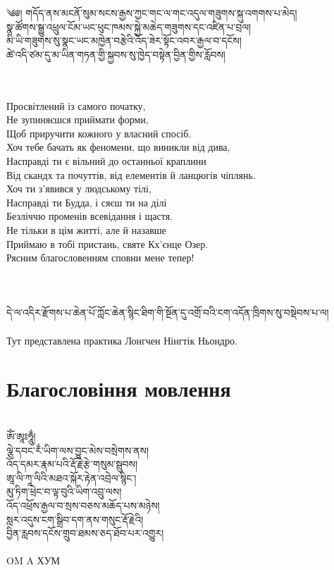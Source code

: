 \small
\ti
༄༅། གདོད་ནས་མངནོ་སུམ་སངས་རྒྱས་ཀྱང་གང་ལ་གང་འདུལ་གཟུགས་སྐུ་འགགས་པ་མེད།\\
སྣ་ཚོགས་སྒྱུ་འཕྲུལ་ངོམ་ཡང་ཕུང་ཁམས་སྐྱེ་མཆེད་གཟུགས་དང་འཛིན་པ་བྲལ།\\
མི་ཡི་གཟུགས་སུ་སྣང་ཡང་མཁྱེན་བརྩེའི་འོད་ཟེར་སྟོང་འབར་རྒྱལ་བ་དངོས།\\
ཚེ་འདི་ཙམ་དུ་མ་ཡིན་གཏན་གྱི་སྐྱབས་སུ་ཁྱེད་བསྟེན་བྱིན་གྱིས་རློབས།\\
\\
\\
\ru

Просвітлений із самого початку,\\
Не зупиняєшся приймати форми,\\
Щоб приручити кожного у власний спосіб.\\
Хоч тебе бачать як феномени, що виникли від дива,\\
Насправді ти є вільний до останньої краплини\\
Від скандх та почуттів, від елементів й ланцюгів чіплянь.\\
Хоч ти з’явився у людському тілі,\\
Насправді ти Будда, і сяєш ти на ділі\\
Безліччю променів всевідання і щастя.\\
Не тільки в цім житті, але й назавше\\
Приймаю в тобі пристань, святе Кх'єнце Озер.\\
Рясним благословенням сповни мене тепер!\\

\\
\\
\vspace{0.5cm}
\\
\scriptsize
\ti དེ་ལ་འདིར་རྫོགས་པ་ཆེན་པོ་ཀློང་ཆེན་སྙིང་ཐིག་གི་སྔོན་དུ་འགྲོ་བའི་ངག་འདོན་ཁྲིགས་སུ་བསྡེབས་པ་ལ།\\
\\
\ru Тут представлена практика Лонгчен Нінгтік Ньондро.\\

\normalsize
\newpage
\section*{Благословіння мовлення}
\\
\ti
ཨོཾ་ཨཱཿཧཱུྂ།\\
ལྕེ་དབང་རྂ་ཡིག་ལས་བྱུང་མེས་བསྲེགས་ནས། \\
འོད་དམར་རྣམ་པའི་རྡོ་རྗེ་རྩེ་གསུམ་སྦུབས།\\
ཨཱ་ལི་ཀཱ་ལིའི་མཐའ་སྐོར་རྟེན་འབྲེལ་སྙིང་།\\
མུ་ཏིག་ཕྲེང་བ་ལྟ་བུའི་ཡིག་འབྲུ་ལས།\\
འོད་འཕྲོས་རྒྱལ་བ་སྲས་བཅས་མཆོད་པས་མཉེས།\\
སླར་འདུས་ངག་སྒྲིབ་དག་ནས་གསུང་རྡོ་རྗེའི།\\
བྱིན་རླབས་དངོས་གྲུབ་ཐམས་ཅད་ཐོབ་པར་འགྱུར།\\
\\
\ru
OM A ХУМ \\

